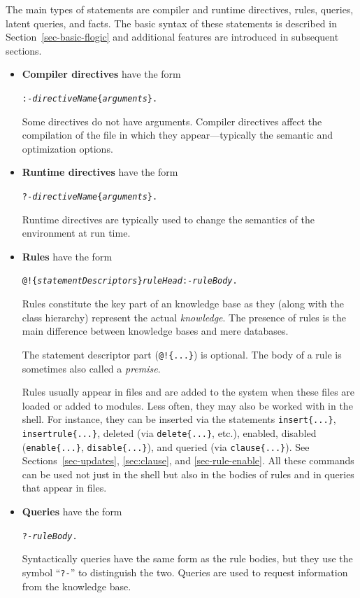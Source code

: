 \documentclass[11pt]{article}
\newcommand{\ERGO}{\mbox{\smaller{\ensuremath{\cal{E}}\smaller{{\sc{RGO}}}}}\xspace}
\newcommand{\FLSYSTEM}{\ERGO}
\begin{document}
The main types of \FLSYSTEM statements are compiler and runtime directives,
rules, queries, latent queries, and facts. The basic syntax of these
statements is described in Section~\ref{sec-basic-flogic} and additional
features are introduced in subsequent sections.
\begin{itemize}
\item  \textbf{Compiler directives} have the form
\begin{alltt}
     :- \emph{directiveName}\{\emph{arguments}\}. 
\end{alltt}
  Some directives do not have arguments. Compiler directives affect the
  compilation of the file in which they appear---typically the
  semantic and optimization options.
\item \textbf{Runtime directives} have the form
\begin{alltt}
     ?- \emph{directiveName}\{\emph{arguments}\}. 
\end{alltt}
  Runtime directives are typically used to change the semantics of the
  environment at run time.
\item \textbf{Rules} have the form
\begin{alltt}
     @!\{\emph{statementDescriptors}\}  \emph{ruleHead}  :-  \emph{ruleBody}. 
\end{alltt}
  Rules constitute the key part of an \FLSYSTEM knowledge base
  as they (along with the class hierarchy)
  represent the actual \emph{knowledge}.
  The presence of rules is the main difference between knowledge bases and
  mere databases.

  The statement descriptor part
  (\texttt{@!\{...\}})  is optional. The body of a rule is sometimes also
  called a \emph{premise}. 

  Rules usually appear in files and are added to the system when these
  files are loaded or added to modules. Less often,
  they may also be worked with in the \FLSYSTEM shell.
  For instance, they can be inserted via the
  statements \texttt{insert\{...\}}, \texttt{insertrule\{...\}}, 
  deleted (via \texttt{delete\{...\}}, etc.), enabled, disabled
  (\texttt{enable\{...\}}, \texttt{disable\{...\}}),
  and queried (via \texttt{clause\{...\}}).
  See Sections~\ref{sec-updates}, \ref{sec:clause}, and \ref{sec-rule-enable}.
  All these commands can be used not just in the shell but also in the
  bodies of rules and in queries that appear in files.
\item \textbf{Queries} have the form
\begin{alltt}
     ?- \emph{ruleBody}.
\end{alltt}
  Syntactically queries have the same form as the rule bodies, but they use
  the symbol ``\texttt{?-}''  to distinguish the two. Queries are
  used to request information from the knowledge base.


\end{itemize}
\end{document}

